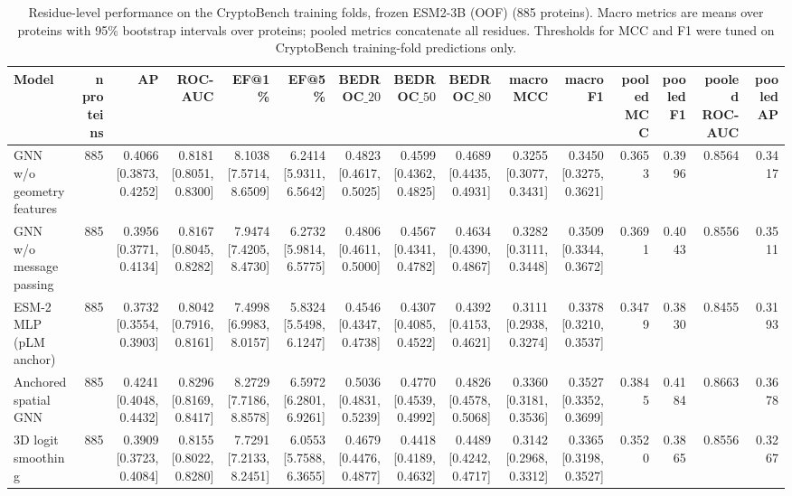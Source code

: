 \begin{table}[t]
\centering
\small
\caption{Residue-level performance on the CryptoBench training folds, frozen ESM2-3B (OOF) (885 proteins). Macro metrics are means over proteins with 95\% bootstrap intervals over proteins; pooled metrics concatenate all residues. Thresholds for MCC and F1 were tuned on CryptoBench training-fold predictions only.}
\label{tab:table_absolute}
\begin{tabular}{lrrrrrrrrrrrrrr}
\toprule
Model & n proteins & AP & ROC-AUC & EF@1\% & EF@5\% & BEDROC$\_{20}$ & BEDROC$\_{50}$ & BEDROC$\_{80}$ & macro MCC & macro F1 & pooled MCC & pooled F1 & pooled ROC-AUC & pooled AP \\
\midrule
GNN w/o geometry features & 885 & 0.4066 [0.3873, 0.4252] & 0.8181 [0.8051, 0.8300] & 8.1038 [7.5714, 8.6509] & 6.2414 [5.9311, 6.5642] & 0.4823 [0.4617, 0.5025] & 0.4599 [0.4362, 0.4825] & 0.4689 [0.4435, 0.4931] & 0.3255 [0.3077, 0.3431] & 0.3450 [0.3275, 0.3621] & 0.3653 & 0.3996 & 0.8564 & 0.3417 \\
GNN w/o message passing & 885 & 0.3956 [0.3771, 0.4134] & 0.8167 [0.8045, 0.8282] & 7.9474 [7.4205, 8.4730] & 6.2732 [5.9814, 6.5775] & 0.4806 [0.4611, 0.5000] & 0.4567 [0.4341, 0.4782] & 0.4634 [0.4390, 0.4867] & 0.3282 [0.3111, 0.3448] & 0.3509 [0.3344, 0.3672] & 0.3691 & 0.4043 & 0.8556 & 0.3511 \\
ESM-2 MLP (pLM anchor) & 885 & 0.3732 [0.3554, 0.3903] & 0.8042 [0.7916, 0.8161] & 7.4998 [6.9983, 8.0157] & 5.8324 [5.5498, 6.1247] & 0.4546 [0.4347, 0.4738] & 0.4307 [0.4085, 0.4522] & 0.4392 [0.4153, 0.4621] & 0.3111 [0.2938, 0.3274] & 0.3378 [0.3210, 0.3537] & 0.3479 & 0.3830 & 0.8455 & 0.3193 \\
Anchored spatial GNN & 885 & 0.4241 [0.4048, 0.4432] & 0.8296 [0.8169, 0.8417] & 8.2729 [7.7186, 8.8578] & 6.5972 [6.2801, 6.9261] & 0.5036 [0.4831, 0.5239] & 0.4770 [0.4539, 0.4992] & 0.4826 [0.4578, 0.5068] & 0.3360 [0.3181, 0.3536] & 0.3527 [0.3352, 0.3699] & 0.3845 & 0.4184 & 0.8663 & 0.3678 \\
3D logit smoothing & 885 & 0.3909 [0.3723, 0.4084] & 0.8155 [0.8022, 0.8280] & 7.7291 [7.2133, 8.2451] & 6.0553 [5.7588, 6.3655] & 0.4679 [0.4476, 0.4877] & 0.4418 [0.4189, 0.4632] & 0.4489 [0.4242, 0.4717] & 0.3142 [0.2968, 0.3312] & 0.3365 [0.3198, 0.3527] & 0.3520 & 0.3865 & 0.8556 & 0.3267 \\
\bottomrule
\end{tabular}
\end{table}
